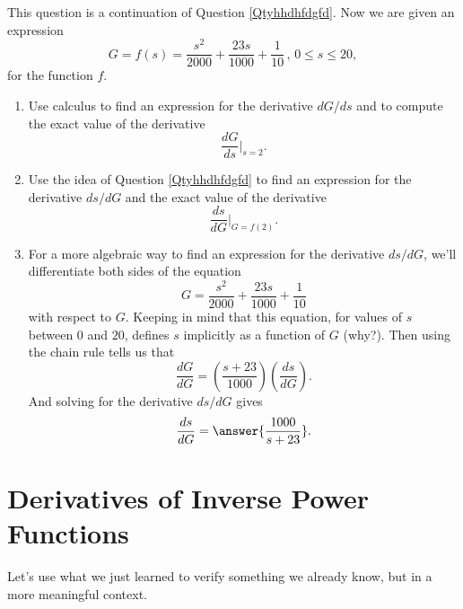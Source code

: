 \documentclass{ximera}
\begin{document}
\begin{question}  \label{Qttynmmbbb}
This question is a continuation of Question \ref{Qtyhhdhfdgfd}. Now we are given an expression
\[
   G = f(s)  = \frac{s^2}{2000} + \frac{23s}{1000} + \frac{1}{10} \, , \, 0\leq s\leq 20, 
\]
for the function $f$.

\begin{enumerate}
\item Use calculus to find an expression for the derivative $dG/ds$ and to compute the exact value of the derivative
\[
        \frac{dG}{ds}\Big|_{s=2} .
\]

\item Use the idea of Question \ref{Qtyhhdhfdgfd} to find an expression for the derivative $ds/dG$ and the exact value of the derivative
\[
   \frac{ds}{dG}\Big|_{G=f(2)} .
\]

\item For a more algebraic way to find an expression for the derivative $ds/dG$, we'll differentiate both sides of the equation
\[
    G =  \frac{s^2}{2000} + \frac{23s}{1000} + \frac{1}{10}
\]
with respect to $G$. Keeping in mind that this equation, for values of $s$ between $0$ and $20$, defines $s$ implicitly as a function of $G$ (why?). Then using the chain rule tells us that
\[
     \frac{dG}{dG} = \left( \frac{s+23}{1000} \right)  \left(\frac{ds}{dG} \right) .
\]
And solving for the derivative $ds/dG$ gives
\[
     \frac{ds}{dG} = \answer{\frac{1000}{s+23}} .
\]

\end{enumerate}
\end{question}


\section{Derivatives of Inverse Power Functions}
Let's use what we just learned to verify something we already know, but in a more meaningful context.
\end{document}

